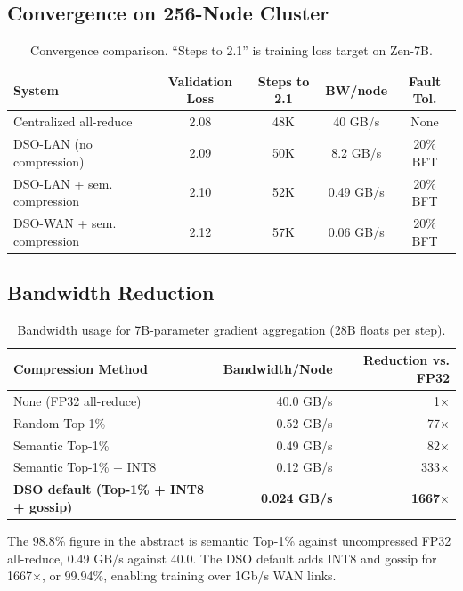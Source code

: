 \documentclass[11pt,a4paper]{article}
\begin{document}
\subsection{Convergence on 256-Node Cluster}

\begin{table}[H]
\centering
\begin{tabular}{lcccc}
\toprule
\textbf{System} & \textbf{Validation Loss} & \textbf{Steps to 2.1} & \textbf{BW/node} & \textbf{Fault Tol.} \\
\midrule
Centralized all-reduce & 2.08 & 48K & 40 GB/s & None \\
DSO-LAN (no compression) & 2.09 & 50K & 8.2 GB/s & 20\% BFT \\
DSO-LAN + sem. compression & 2.10 & 52K & 0.49 GB/s & 20\% BFT \\
DSO-WAN + sem. compression & 2.12 & 57K & 0.06 GB/s & 20\% BFT \\
\bottomrule
\end{tabular}
\caption{Convergence comparison. ``Steps to 2.1'' is training loss target on Zen-7B.}
\end{table}

\subsection{Bandwidth Reduction}

\begin{table}[H]
\centering
\begin{tabular}{lrr}
\toprule
\textbf{Compression Method} & \textbf{Bandwidth/Node} & \textbf{Reduction vs. FP32} \\
\midrule
None (FP32 all-reduce) & 40.0 GB/s & 1$\times$ \\
Random Top-1\% & 0.52 GB/s & 77$\times$ \\
Semantic Top-1\% & 0.49 GB/s & 82$\times$ \\
Semantic Top-1\% + INT8 & 0.12 GB/s & 333$\times$ \\
\textbf{DSO default (Top-1\% + INT8 + gossip)} & \textbf{0.024 GB/s} & \textbf{1667$\times$} \\
\bottomrule
\end{tabular}
\caption{Bandwidth usage for 7B-parameter gradient aggregation (28B floats per step).}
\end{table}

The 98.8\% figure in the abstract is semantic Top-1\% against uncompressed FP32
all-reduce, 0.49 GB/s against 40.0. The DSO default adds INT8 and gossip for
1667$\times$, or 99.94\%, enabling training over 1Gb/s WAN links.
\end{document}
